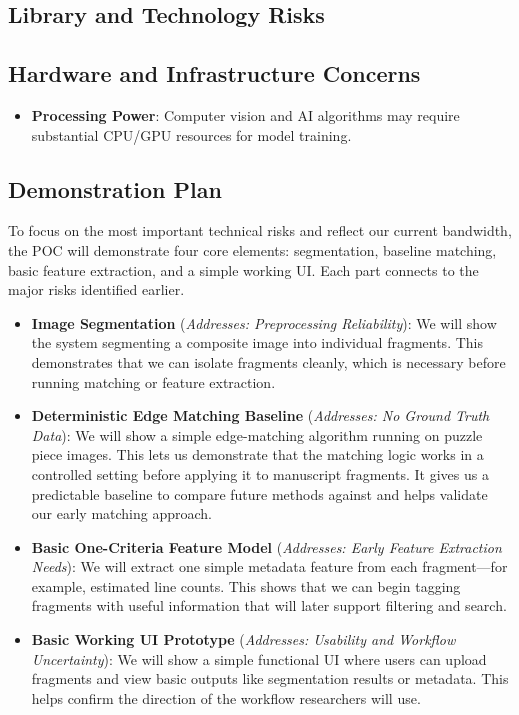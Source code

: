 \documentclass{article}
\begin{document}
\subsection{Library and Technology Risks}

\subsection{Hardware and Infrastructure Concerns}

\begin{itemize}
\item \textbf{Processing Power}: Computer vision and AI algorithms may require substantial CPU/GPU resources for model training.
\end{itemize}

\subsection{Demonstration Plan}

To focus on the most important technical risks and reflect our current bandwidth, the POC will demonstrate four core elements: segmentation, baseline matching, basic feature extraction, and a simple working UI. Each part connects to the major risks identified earlier.

\begin{itemize}

\item \textbf{Image Segmentation} (\textit{Addresses: Preprocessing Reliability}):
We will show the system segmenting a composite image into individual fragments. This demonstrates that we can isolate fragments cleanly, which is necessary before running matching or feature extraction.

\item \textbf{Deterministic Edge Matching Baseline} (\textit{Addresses: No Ground Truth Data}):
We will show a simple edge-matching algorithm running on puzzle piece images. This lets us demonstrate that the matching logic works in a controlled setting before applying it to manuscript fragments. It gives us a predictable baseline to compare future methods against and helps validate our early matching approach.

\item \textbf{Basic One-Criteria Feature Model} (\textit{Addresses: Early Feature Extraction Needs}):
We will extract one simple metadata feature from each fragment—for example, estimated line counts. This shows that we can begin tagging fragments with useful information that will later support filtering and search.

\item \textbf{Basic Working UI Prototype} (\textit{Addresses: Usability and Workflow Uncertainty}):
We will show a simple functional UI where users can upload fragments and view basic outputs like segmentation results or metadata. This helps confirm the direction of the workflow researchers will use.

\end{itemize}
\end{document}
